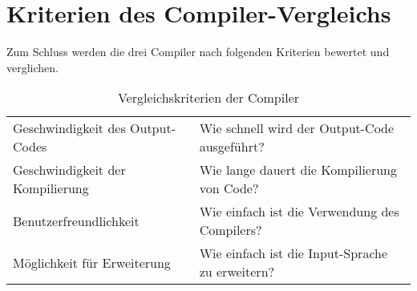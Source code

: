 \section{Kriterien des Compiler-Vergleichs}
Zum Schluss werden die drei Compiler nach folgenden Kriterien bewertet und verglichen.

\begin{table}[H]
    \centering
    \caption{Vergleichskriterien der Compiler}
    \vspace{3mm} %

    \begin{tabular}{l|l}
    Geschwindigkeit des Output-Codes    & Wie schnell wird der Output-Code ausgeführt?                      \\
    Geschwindigkeit der Kompilierung    & Wie lange dauert die Kompilierung von Code?                       \\
    Benutzerfreundlichkeit              & Wie einfach ist die Verwendung des Compilers?                     \\
    Möglichkeit für Erweiterung         & Wie einfach ist die Input-Sprache zu erweitern?                                 
    \end{tabular}
\end{table}

